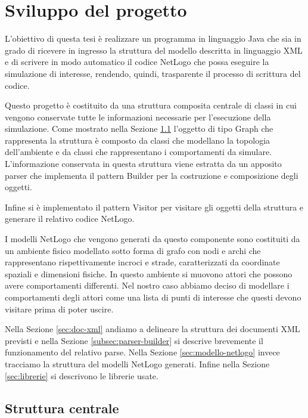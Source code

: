\chapter{Sviluppo del progetto}
\label{cap:sviluppo-progetto}

L'obiettivo di questa tesi è realizzare un programma in linguaggio Java che sia in grado di ricevere in ingresso la struttura del modello descritta in linguaggio XML e di scrivere in modo automatico il codice NetLogo che possa eseguire la simulazione di interesse, rendendo, quindi, trasparente il processo di scrittura del codice.

Questo progetto è costituito da una struttura composita centrale di classi in cui vengono conservate tutte le informazioni necessarie per l'esecuzione della simulazione. Come mostrato nella Sezione \ref{sec:strttura-interna} l'oggetto di tipo Graph che rappresenta la struttura è composto da classi che modellano la topologia dell'ambiente e da classi che rappresentano i comportamenti da simulare. L'informazione conservata in questa struttura viene estratta da un apposito parser che implementa il pattern Builder per la costruzione e composizione degli oggetti.

Infine si è implementato il pattern Visitor per visitare gli oggetti della struttura e generare il relativo codice NetLogo.

I modelli NetLogo che vengono generati da questo componente sono costituiti da un ambiente fisico modellato sotto forma di grafo con nodi e archi che rappresentano rispettivamente incroci e strade, caratterizzati da coordinate spaziali e dimensioni fisiche. In questo ambiente si muovono attori che possono avere comportamenti differenti. Nel nostro caso abbiamo deciso di modellare i comportamenti degli attori come una lista di punti di interesse che questi devono visitare prima di poter uscire.

Nella Sezione \ref{sec:doc-xml} andiamo a delineare la struttura dei documenti XML previsti e nella Sezione \ref{subsec:parser-builder} si descrive brevemente il funzionamento del relativo parse. Nella Sezione \ref{sec:modello-netlogo} invece tracciamo la struttura del modelli NetLogo generati. Infine nella Sezione \ref{sec:librerie} si descrivono le librerie usate.

\section{Struttura centrale}
\label{sec:strttura-interna}

